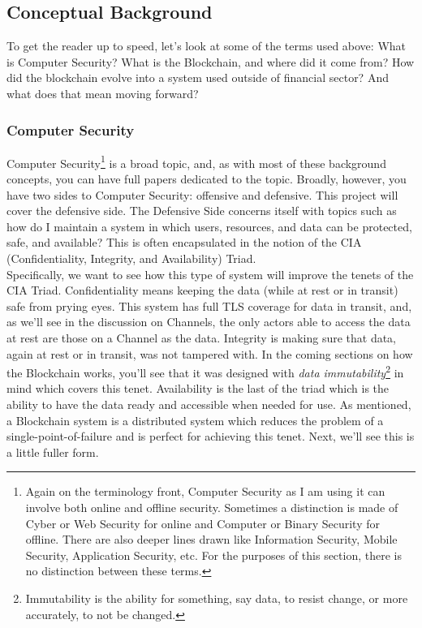 	\subsection{Conceptual Background}
		\hspace{10mm}To get the reader up to speed, let's look at some of the terms used above: What is Computer Security? What is the Blockchain, and where did it come from? How did the blockchain evolve into a system used outside of financial sector? And what does that mean moving forward?
		
		\subsubsection{Computer Security}
			\hspace{10mm}Computer Security\footnote{Again on the terminology front, Computer Security as I am using it can involve both online and offline security. Sometimes a distinction is made of Cyber or Web Security for online and Computer or Binary Security for offline. There are also deeper lines drawn like Information Security, Mobile Security, Application Security, etc. For the purposes of this section, there is no distinction between these terms.} is a broad topic, and, as with most of these background concepts, you can have full papers dedicated to the topic. Broadly, however, you have two sides to Computer Security: offensive and defensive. This project will cover the defensive side. The Defensive Side concerns itself with topics such as how do I maintain a system in which users, resources, and data can be protected, safe, and available? This is often encapsulated in the notion of the CIA (Confidentiality, Integrity, and Availability) Triad.\\
			
			\hspace{10mm}Specifically, we want to see how this type of system will improve the tenets of the CIA Triad. Confidentiality means keeping the data (while at rest or in transit) safe from prying eyes. This system has full TLS coverage for data in transit, and, as we'll see in the discussion on Channels, the only actors able to access the data at rest are those on a Channel as the data. Integrity is making sure that data, again at rest or in transit, was not tampered with. In the coming sections on how the Blockchain works, you'll see that it was designed with \textit{data immutability}\footnote{Immutability is the ability for something, say data, to resist change, or more accurately, to not be changed.} in mind which covers this tenet. Availability is the last of the triad which is the ability to have the data ready and accessible when needed for use. As mentioned, a Blockchain system is a distributed system which reduces the problem of a single-point-of-failure and is perfect for achieving this tenet. Next, we'll see this is a little fuller form.
			
